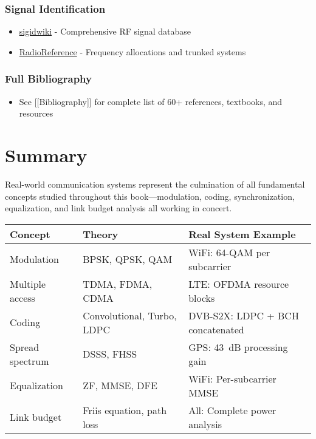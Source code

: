 \subsubsection{Signal Identification}\label{signal-identification}

\begin{itemize}
\tightlist
\item
  \href{https://www.sigidwiki.com/wiki/Signal_Identification_Guide}{sigidwiki}
  - Comprehensive RF signal database
\item
  \href{https://www.radioreference.com/}{RadioReference} - Frequency
  allocations and trunked systems
\end{itemize}

\subsubsection{Full Bibliography}\label{full-bibliography}

\begin{itemize}
\tightlist
\item
  See {[}{[}Bibliography{]}{]} for complete list of 60+ references,
  textbooks, and resources
\end{itemize}

\section{Summary}

Real-world communication systems represent the culmination of all fundamental concepts studied throughout this book---modulation, coding, synchronization, equalization, and link budget analysis all working in concert.

\begin{center}
\begin{tabular}{@{}lll@{}}
\toprule
\textbf{Concept} & \textbf{Theory} & \textbf{Real System Example} \\
\midrule
Modulation & BPSK, QPSK, QAM & WiFi: 64-QAM per subcarrier \\
Multiple access & TDMA, FDMA, CDMA & LTE: OFDMA resource blocks \\
Coding & Convolutional, Turbo, LDPC & DVB-S2X: LDPC + BCH concatenated \\
Spread spectrum & DSSS, FHSS & GPS: 43~dB processing gain \\
Equalization & ZF, MMSE, DFE & WiFi: Per-subcarrier MMSE \\
Link budget & Friis equation, path loss & All: Complete power analysis \\
\bottomrule
\end{tabular}
\end{center}

